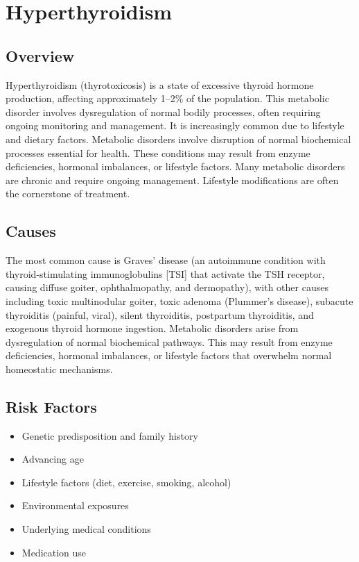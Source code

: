 \chapter{Hyperthyroidism}
\label{sec:Hyperthyroidism}

\section{Overview}
Hyperthyroidism (thyrotoxicosis) is a state of excessive thyroid hormone production, affecting approximately 1--2\% of the population. This metabolic disorder involves dysregulation of normal bodily processes, often requiring ongoing monitoring and management. It is increasingly common due to lifestyle and dietary factors. Metabolic disorders involve disruption of normal biochemical processes essential for health. These conditions may result from enzyme deficiencies, hormonal imbalances, or lifestyle factors. Many metabolic disorders are chronic and require ongoing management. Lifestyle modifications are often the cornerstone of treatment.
\section{Causes}
The most common cause is Graves' disease (an autoimmune condition with thyroid-stimulating immunoglobulins [TSI] that activate the TSH receptor, causing diffuse goiter, ophthalmopathy, and dermopathy), with other causes including toxic multinodular goiter, toxic adenoma (Plummer's disease), subacute thyroiditis (painful, viral), silent thyroiditis, postpartum thyroiditis, and exogenous thyroid hormone ingestion. Metabolic disorders arise from dysregulation of normal biochemical pathways. This may result from enzyme deficiencies, hormonal imbalances, or lifestyle factors that overwhelm normal homeostatic mechanisms.   
\section{Risk Factors}
\begin{itemize}[noitemsep]
  \item Genetic predisposition and family history
  \item Advancing age
  \item Lifestyle factors (diet, exercise, smoking, alcohol)
  \item Environmental exposures
  \item Underlying medical conditions
  \item Medication use
\end{itemize}
